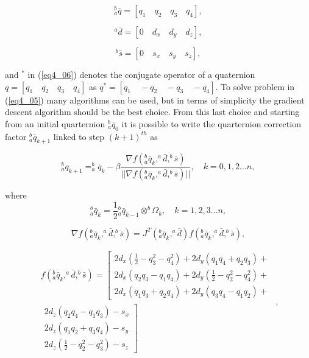 \begin{equation}
\label{eq4_07}
^b_a \bar{q} = [q_1 \quad q_2 \quad q_3 \quad q_4],
\end{equation}

\begin{equation}
\label{eq4_08}
^a \bar{d} = [0 \quad d_x \quad d_y \quad d_z],
\end{equation}

\begin{equation}
\label{eq4_09}
^b \bar{s} = [0 \quad s_x \quad s_y \quad s_z],
\end{equation}

\noindent and $^{*}$ in (\ref{eq4_06}) denotes the conjugate operator of a quaternion $q = [q_1 \quad q_2 \quad q_3 \quad q_4]$ as $q^* = [q_1 \quad -q_2 \quad -q_3 \quad -q_4]$. To solve problem in (\ref{eq4_05}) many algorithms can be used, but in terms of simplicity the gradient descent algorithm should be the best choice. From this last choice and starting from an initial quarternion $^b_a \bar{q}_0$ it is possible to write the quarternion correction factor $^b_a \bar{q}_{k+1}$ linked to step $(k+1)^{th}$ as

\begin{equation}
\label{eq4_10}
^b_a q_{k+1} = ^b_a \bar{q}_k - \beta \frac{\nabla f(^b_a \bar{q}_k, ^a \bar{d}, ^b \bar{s})}{\vert \vert \nabla f(^b_a \bar{q}_k, ^a \bar{d}, ^b \bar{s}) \vert \vert}, \quad k = 0,1,2 \dots n,
\end{equation}

\noindent where 
\begin{equation}
\label{eq4_10bis}
^b_a \bar{q}_k = \frac{1}{2} {^b_a \bar{q}_{k-1}} \otimes ^b{\Omega_k},  \quad k = 1,2,3 \dots n,
\end{equation}

\begin{equation}
\label{eq4_11}
\nabla f(^b_a \bar{q}_k, ^a \bar{d}, ^b \bar{s}) = J^T(^b_a \bar{q}_k,^a \bar{d}) f(^b_a \bar{q}_k, ^a \bar{d}, ^b \bar{s}),
\end{equation}

\begin{equation}
\label{eq4_12}
\begin{split}
f(^b_a \bar{q}_k, ^a \bar{d}, ^b \bar{s}) = 
\left [ \begin{array}{c} 
2d_x(\frac{1}{2} - q_3^2 - q_4^2) + 2d_y(q_1q_4 + q_2 q_3) + \\ 
2d_x(q_2 q_3 - q_1 q_4) + 2d_y(\frac{1}{2} - q_2^2 - q_4^2) + \\ 
2d_x(q_1 q_3 + q_2 q_4) + 2d_y(q_3 q_4 - q_1 q_2) + \end{array} \right. \\
\left. \begin{array}{r}
2 d_z(q_2q_4 - q_1q_3) - s_x \\
2d_z(q_1q_2 + q_3 q_4) - s_y \\
2d_z(\frac{1}{2} - q_2^2 - q_3^2) - s_z  
\end{array} \right ] \end{split}, 
\end{equation}


